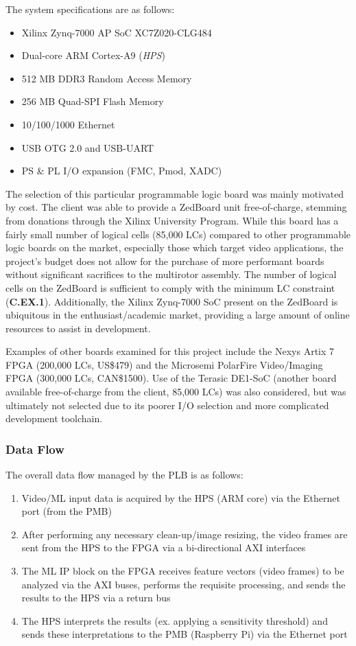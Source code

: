 The system specifications are as follows\cite{zedboard}:
\begin{itemize}
\item Xilinx Zynq-7000 AP SoC XC7Z020-CLG484
\item Dual-core ARM Cortex-A9 (\textit{HPS})
\item 512 MB DDR3 Random Access Memory
\item 256 MB Quad-SPI Flash Memory
\item 10/100/1000 Ethernet 
\item USB OTG 2.0 and USB-UART 
\item PS \& PL I/O expansion (FMC, Pmod, XADC)
\end{itemize}

The selection of this particular programmable logic board was mainly motivated by cost. The client was able to provide a ZedBoard unit free-of-charge, stemming from donations through the Xilinx University Program. While this board has a fairly small number of logical cells (85,000 LCs) compared to other programmable logic boards on the market, especially those which target video applications, the project's budget does not allow for the purchase of more performant boards without significant sacrifices to the multirotor assembly. The number of logical cells on the ZedBoard is sufficient to comply with the minimum LC constraint (\textbf{C.EX.1}). Additionally, the Xilinx Zynq-7000 SoC present on the ZedBoard is ubiquitous in the enthusiast/academic market, providing a large amount of online resources to assist in development.

Examples of other boards examined for this project include the Nexys Artix 7 FPGA (200,000 LCs, US\$479)\cite{nexys} and the Microsemi PolarFire Video/Imaging FPGA (300,000 LCs, CAN\$1500)\cite{microsemi}. Use of the Terasic DE1-SoC (another board available free-of-charge from the client, 85,000 LCs) was also considered, but was ultimately not selected due to its poorer I/O selection and more complicated development toolchain.

\subsubsection{Data Flow}
The overall data flow managed by the PLB is as follows:
\begin{enumerate}
\item Video/ML input data is acquired by the HPS (ARM core) via the Ethernet port (from the PMB)
\item After performing any necessary clean-up/image resizing, the video frames are sent from the HPS to the FPGA via a bi-directional AXI interfaces
\item The ML IP block on the FPGA receives feature vectors (video frames) to be analyzed via the AXI buses, performs the requisite processing, and sends the results to the HPS via a return bus
\item The HPS interprets the results (ex. applying a sensitivity threshold) and sends these interpretations to the PMB (Raspberry Pi) via the Ethernet port
\end{enumerate}

